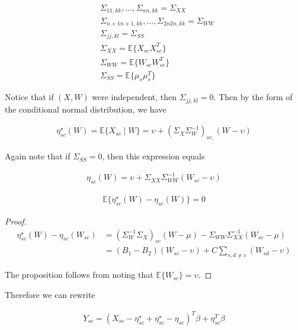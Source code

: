 \begin{align*}
    & \Sigma_{11, kk}, ..., \Sigma_{nn, kk} = \Sigma_{XX} \\
    & \Sigma_{n+1n+1, kk}, ..., \Sigma_{2n2n, kk} = \Sigma_{WW} \\
    & \Sigma_{jj, kl} = \Sigma_{SS} \\
    & \Sigma_{XX} = \mathbb{E}\{X_{sc}X_{sc}^T\} \\
    & \Sigma_{WW} = \mathbb{E}\{W_{sc}W_{sc}^T\} \\
    & \Sigma_{SS} = \mathbb{E}\{\mu_s\mu_s^T\}
\end{align*}

Notice that if $(X, W)$ were independent, then $\Sigma_{jj, kl} = 0$. Then by the form of the conditional normal distribution, we have

\begin{align*}
    \eta_{sc}^\star(W) = \mathbb{E}\{X_{sc} \mid W\} = \upsilon + (\Sigma_X\Sigma_W^{-1})_{sc, }(W - \upsilon)
\end{align*}

Again note that if $\Sigma_{SS} = 0$, then this expression equals

\begin{align*}
    \eta_{sc}(W) = \upsilon + \Sigma_{XX}\Sigma_{WW}^{-1}(W_{sc} - \upsilon)
\end{align*}

\begin{proposition}
    \begin{align*}
    \mathbb{E}\{\eta_{sc}^\star(W) - \eta_{sc}(W)\} = 0
    \end{align*}
\end{proposition}

\begin{proof}

\begin{align*}
    \eta_{sc}^\star(W) - \eta_{sc}(W_{sc}) &= (\Sigma_{W}^{-1}\Sigma_{X})_{sc}(W - \mu) - \Sigma_{WW}\Sigma_{XX}^{-1}(W_{sc} - \mu) \\
    &= (B_1 - B_2)(W_{sc} - \upsilon) + C\sum_{s, d \ne c}(W_{sd} - \upsilon)
\end{align*}

The proposition follows from noting that $\mathbb{E}\{W_{sc}\} = \upsilon$.
\end{proof}

Therefore we can rewrite

\begin{align*}
Y_{sc} = (X_{sc} - \eta^\star_{sc} + \eta^\star_{sc} - \eta_{sc})^T\beta + \eta^T_{sc}\beta
\end{align*}

